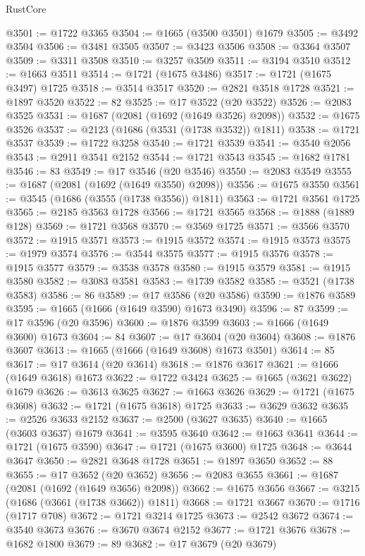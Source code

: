 \begin{lexlean}{RustCore}
\begin{coremodule}
@3501 := @1722 @3365
@3504 := @1665 (@3500 @3501) @1679
@3505 := @3492 @3504
@3506 := @3481 @3505
@3507 := @3423 @3506
@3508 := @3364 @3507
@3509 := @3311 @3508
@3510 := @3257 @3509
@3511 := @3194 @3510
@3512 := @1663 @3511
@3514 := @1721 (@1675 @3486)
@3517 := @1721 (@1675 @3497) @1725
@3518 := @3514 @3517
@3520 := @2821 @3518 @1728
@3521 := @1897 @3520
@3522 := 82
@3525 := @17 @3522 (@20 @3522)
@3526 := @2083 @3525
@3531 := @1687 (@2081 (@1692 (@1649 @3526) @2098))
@3532 := @1675 @3526
@3537 := @2123 (@1686 (@3531 (@1738 @3532)) @1811)
@3538 := @1721 @3537
@3539 := @1722 @3258
@3540 := @1721 @3539
@3541 := @3540 @2056
@3543 := @2911 @3541 @2152
@3544 := @1721 @3543
@3545 := @1682 @1781
@3546 := 83
@3549 := @17 @3546 (@20 @3546)
@3550 := @2083 @3549
@3555 := @1687 (@2081 (@1692 (@1649 @3550) @2098))
@3556 := @1675 @3550
@3561 := @3545 (@1686 (@3555 (@1738 @3556)) @1811)
@3563 := @1721 @3561 @1725
@3565 := @2185 @3563 @1728
@3566 := @1721 @3565
@3568 := @1888 (@1889 @128)
@3569 := @1721 @3568
@3570 := @3569 @1725
@3571 := @3566 @3570
@3572 := @1915 @3571
@3573 := @1915 @3572
@3574 := @1915 @3573
@3575 := @1979 @3574
@3576 := @3544 @3575
@3577 := @1915 @3576
@3578 := @1915 @3577
@3579 := @3538 @3578
@3580 := @1915 @3579
@3581 := @1915 @3580
@3582 := @3083 @3581
@3583 := @1739 @3582
@3585 := @3521 (@1738 @3583)
@3586 := 86
@3589 := @17 @3586 (@20 @3586)
@3590 := @1876 @3589
@3595 := @1665 (@1666 (@1649 @3590) @1673 @3490)
@3596 := 87
@3599 := @17 @3596 (@20 @3596)
@3600 := @1876 @3599
@3603 := @1666 (@1649 @3600) @1673
@3604 := 84
@3607 := @17 @3604 (@20 @3604)
@3608 := @1876 @3607
@3613 := @1665 (@1666 (@1649 @3608) @1673 @3501)
@3614 := 85
@3617 := @17 @3614 (@20 @3614)
@3618 := @1876 @3617
@3621 := @1666 (@1649 @3618) @1673
@3622 := @1722 @3424
@3625 := @1665 (@3621 @3622) @1679
@3626 := @3613 @3625
@3627 := @1663 @3626
@3629 := @1721 (@1675 @3608)
@3632 := @1721 (@1675 @3618) @1725
@3633 := @3629 @3632
@3635 := @2526 @3633 @2152
@3637 := @2500 (@3627 @3635)
@3640 := @1665 (@3603 @3637) @1679
@3641 := @3595 @3640
@3642 := @1663 @3641
@3644 := @1721 (@1675 @3590)
@3647 := @1721 (@1675 @3600) @1725
@3648 := @3644 @3647
@3650 := @2821 @3648 @1728
@3651 := @1897 @3650
@3652 := 88
@3655 := @17 @3652 (@20 @3652)
@3656 := @2083 @3655
@3661 := @1687 (@2081 (@1692 (@1649 @3656) @2098))
@3662 := @1675 @3656
@3667 := @3215 (@1686 (@3661 (@1738 @3662)) @1811)
@3668 := @1721 @3667
@3670 := @1716 (@1717 @708)
@3672 := @1721 @3214 @1725
@3673 := @2542 @3672
@3674 := @3540 @3673
@3676 := @3670 @3674 @2152
@3677 := @1721 @3676
@3678 := @1682 @1800
@3679 := 89
@3682 := @17 @3679 (@20 @3679)

\end{coremodule}
\end{lexlean}
